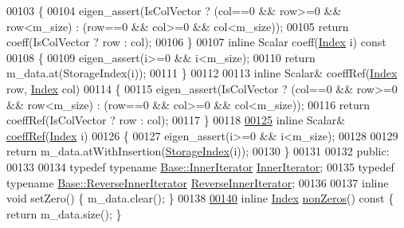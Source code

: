 \begin{DoxyCode}
00103 \textcolor{keyword}{    }\{
00104       eigen\_assert(IsColVector ? (col==0 && row>=0 && row<m\_size) : (row==0 && col>=0 && col<m\_size));
00105       \textcolor{keywordflow}{return} coeff(IsColVector ? row : col);
00106     \}
00107     \textcolor{keyword}{inline} Scalar coeff(\hyperlink{namespace_eigen_a62e77e0933482dafde8fe197d9a2cfde}{Index} i)\textcolor{keyword}{ const}
00108 \textcolor{keyword}{    }\{
00109       eigen\_assert(i>=0 && i<m\_size);
00110       \textcolor{keywordflow}{return} m\_data.at(StorageIndex(i));
00111     \}
00112 
00113     \textcolor{keyword}{inline} Scalar& coeffRef(\hyperlink{namespace_eigen_a62e77e0933482dafde8fe197d9a2cfde}{Index} row, \hyperlink{namespace_eigen_a62e77e0933482dafde8fe197d9a2cfde}{Index} col)
00114     \{
00115       eigen\_assert(IsColVector ? (col==0 && row>=0 && row<m\_size) : (row==0 && col>=0 && col<m\_size));
00116       \textcolor{keywordflow}{return} coeffRef(IsColVector ? row : col);
00117     \}
00118 
\hyperlink{group___sparse_core___module_a4b1845ada6ae59dd7afe361e30136ace}{00125}     \textcolor{keyword}{inline} Scalar& \hyperlink{group___sparse_core___module_a4b1845ada6ae59dd7afe361e30136ace}{coeffRef}(\hyperlink{group___core___module_a554f30542cc2316add4b1ea0a492ff02}{Index} i)
00126     \{
00127       eigen\_assert(i>=0 && i<m\_size);
00128 
00129       \textcolor{keywordflow}{return} m\_data.atWithInsertion(\hyperlink{group___sparse_core___module_a0b540ba724726ebe953f8c0df06081ed}{StorageIndex}(i));
00130     \}
00131 
00132   \textcolor{keyword}{public}:
00133 
00134     \textcolor{keyword}{typedef} \textcolor{keyword}{typename} \hyperlink{class_eigen_1_1_sparse_compressed_base_1_1_inner_iterator}{Base::InnerIterator} \hyperlink{class_eigen_1_1_sparse_compressed_base_1_1_inner_iterator}{InnerIterator};
00135     \textcolor{keyword}{typedef} \textcolor{keyword}{typename} \hyperlink{class_eigen_1_1_sparse_compressed_base_1_1_reverse_inner_iterator}{Base::ReverseInnerIterator} 
      \hyperlink{class_eigen_1_1_sparse_compressed_base_1_1_reverse_inner_iterator}{ReverseInnerIterator};
00136 
00137     \textcolor{keyword}{inline} \textcolor{keywordtype}{void} setZero() \{ m\_data.clear(); \}
00138 
\hyperlink{group___sparse_core___module_aeaa74603bb1405f622726907795c9b5a}{00140}     \textcolor{keyword}{inline} \hyperlink{group___core___module_a554f30542cc2316add4b1ea0a492ff02}{Index} \hyperlink{group___sparse_core___module_aeaa74603bb1405f622726907795c9b5a}{nonZeros}()\textcolor{keyword}{ const  }\{ \textcolor{keywordflow}{return} m\_data.size(); \}

\end{DoxyCode}
